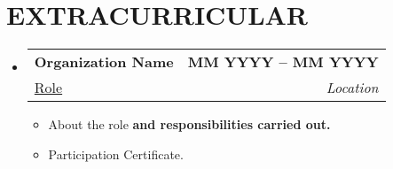 \documentclass[letterpaper,11pt]{article}
\makeatletter
\newcommand{\resumeItem}[1]{
  \item\small{
    {#1 \vspace{-0.5pt}}
  }
}
\newcommand{\resumeSubheading}[4]{
  \vspace{-2pt}\item
    \begin{tabular*}{1.0\textwidth}[t]{l@{\extracolsep{\fill}}r}
      \textbf{\large#1} & \textbf{\small #2} \\
      {\large#3} & \textit{\small #4} \\
      
    \end{tabular*}\vspace{-7pt}
}
\newcommand{\resumeSubHeadingListStart}{\begin{itemize}[leftmargin=0.0in, label={}]}
\newcommand{\resumeSubHeadingListEnd}{\end{itemize}}
\newcommand{\resumeItemListStart}{\begin{itemize}}
\newcommand{\resumeItemListEnd}{\end{itemize}\vspace{-5pt}}
\newcommand\sbullet[1][.5]{\mathbin{\vcenter{\hbox{\scalebox{#1}{$\bullet$}}}}}
\makeatother
\begin{document}
\section{EXTRACURRICULAR}
    \resumeSubHeadingListStart
        \resumeSubheading{Organization Name \href{Certificate Proof link}{\raisebox{-0.1\height}\faExternalLink } }{MM YYYY -- MM YYYY}{\underline{Role}}{Location}
            \resumeItemListStart
                \resumeItem{\normalsize{About the role \textbf{and responsibilities carried out.}}}
                \resumeItem{\normalsize{Participation Certificate. \href{ParticipationCertificateLink.com}{\raisebox{-0.1\height}\faExternalLink }}}
            \resumeItemListEnd
    \resumeSubHeadingListEnd
 \vspace{-11pt}
 



\end{document}
